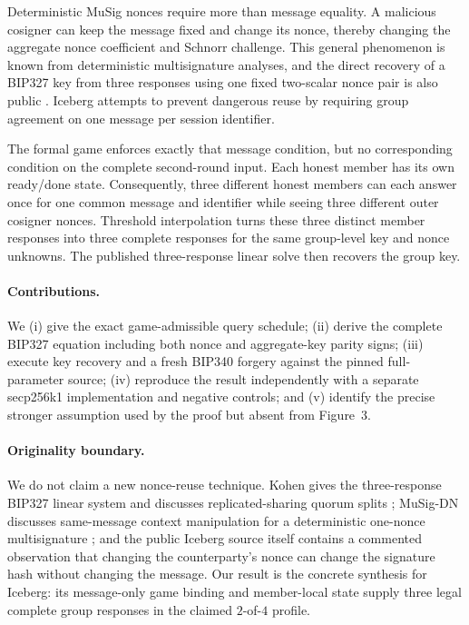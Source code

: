 \documentclass[10pt,a4paper]{article}
\begin{document}
Deterministic MuSig nonces require more than message equality. A malicious
cosigner can keep the message fixed and change its nonce, thereby changing the
aggregate nonce coefficient and Schnorr challenge. This general phenomenon is
known from deterministic multisignature analyses, and the direct recovery of a
BIP327 key from three responses using one fixed two-scalar nonce pair is also
public \cite{musigdn,kohenreuse}. Iceberg attempts to prevent dangerous reuse
by requiring group agreement on one message per session identifier.

The formal game enforces exactly that message condition, but no corresponding
condition on the complete second-round input. Each honest member has its own
ready/done state. Consequently, three different honest members can each answer
once for one common message and identifier while seeing three different outer
cosigner nonces. Threshold interpolation turns these three distinct member
responses into three complete responses for the same group-level key and nonce
unknowns. The published three-response linear solve then recovers the group
key.

\paragraph{Contributions.}
We (i) give the exact game-admissible query schedule; (ii) derive the complete
BIP327 equation including both nonce and aggregate-key parity signs; (iii)
execute key recovery and a fresh BIP340 forgery against the pinned
full-parameter source; (iv) reproduce the result independently with a
separate secp256k1 implementation and negative controls; and (v) identify the
precise stronger assumption used by the proof but absent from Figure~3.

\paragraph{Originality boundary.}
We do not claim a new nonce-reuse technique. Kohen gives the three-response
BIP327 linear system and discusses replicated-sharing quorum splits
\cite{kohenreuse}; MuSig-DN discusses same-message context manipulation for a
deterministic one-nonce multisignature \cite{musigdn}; and the public Iceberg
source itself contains a commented observation that changing the
counterparty's nonce can change the signature hash without changing the
message. Our result is the concrete synthesis for Iceberg: its message-only
game binding and member-local state supply three legal complete group
responses in the claimed $2$-of-$4$ profile.
\end{document}
